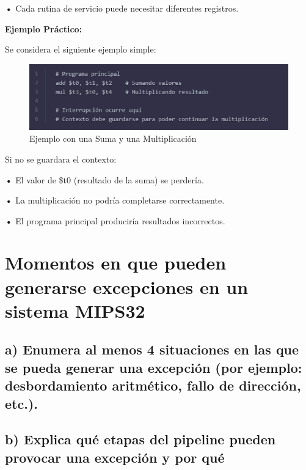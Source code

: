 \documentclass{article}
\begin{document}
\textbf{    •} { Cada rutina de servicio puede necesitar diferentes registros.}

\quad

\textbf{Ejemplo Práctico: }

\quad

{Se considera el siguiente ejemplo simple:}

\begin{figure}[h]
    \centering
    \includegraphics[width=10cm\textwidth]{figura_04_(practica04).png}
    \caption{Ejemplo con una Suma y una Multiplicación}
    \label{fig:img1}
\end{figure}

\quad

{Si no se guardara el contexto:}

\quad

\textbf{    •} { El valor de \$t0 (resultado de la suma) se perdería.}

\textbf{    •} { La multiplicación no podría completarse correctamente.}

\textbf{    •} { El programa principal produciría resultados incorrectos.}


\quad
\newpage








\section{Momentos en que pueden generarse excepciones en un sistema MIPS32}

\subsection*{a) Enumera al menos 4 situaciones en las que se pueda generar una excepción (por ejemplo: desbordamiento aritmético, fallo de dirección, etc.).}

\subsection*{b) Explica qué etapas del pipeline pueden provocar una excepción y por qué}
\end{document}
